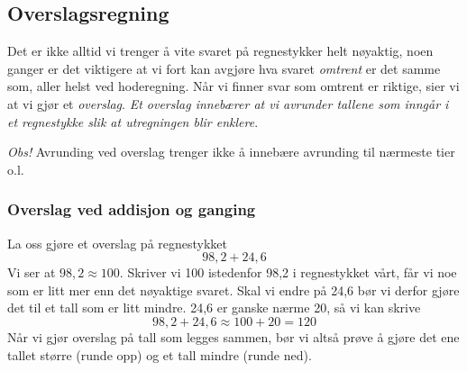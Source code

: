 
\subsection{Overslagsregning}
Det er ikke alltid vi trenger å vite svaret på regnestykker helt nøyaktig, noen ganger er det viktigere at vi fort kan avgjøre hva svaret \textsl{omtrent} er det samme som, aller helst ved hoderegning. Når vi finner svar som omtrent er riktige, sier vi at vi gjør et \textit{overslag}. \textsl{Et overslag innebærer at vi avrunder tallene som inngår i et regnestykke slik at utregningen blir enklere}. \vsk

\textit{Obs!} Avrunding ved overslag trenger ikke å innebære avrunding til nærmeste tier o.l.\vsk


\subsubsection{Overslag ved addisjon og ganging}
La oss gjøre et overslag på regnestykket
\[ 98,2+24,6 \]
Vi ser at $ 98,2 \approx 100 $. Skriver vi 100 istedenfor 98,2 i regnestykket vårt, får vi noe som er litt mer enn det nøyaktige svaret. Skal vi endre på 24,6 bør vi derfor gjøre det til et tall som er litt mindre. 24,6 er ganske nærme 20, så vi kan skrive
\[ 98,2+24,6 \approx 100 + 20 = 120 \]
Når vi gjør overslag på tall som legges sammen, bør vi altså prøve å gjøre det ene tallet større (runde opp) og et tall mindre (runde ned).\\

